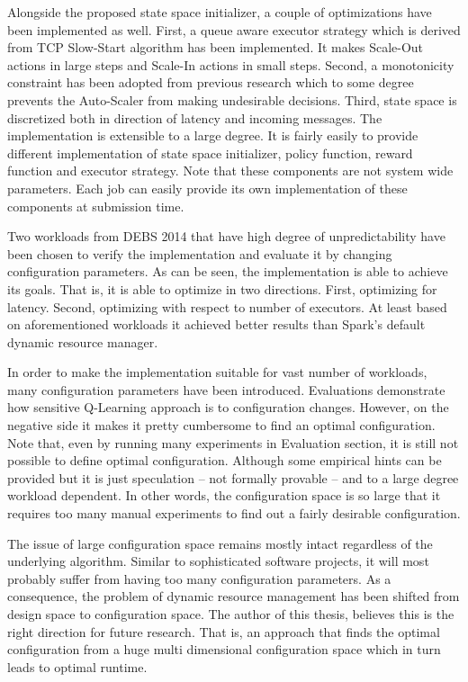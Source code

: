 Alongside the proposed state space initializer, a couple of optimizations have been implemented as well. First, a queue aware executor strategy which is derived from TCP Slow-Start algorithm has been implemented. It makes Scale-Out actions in large steps and Scale-In actions in small steps. Second, a monotonicity constraint has been adopted from previous research which to some degree prevents the Auto-Scaler from making undesirable decisions. Third, state space is discretized both in direction of latency and incoming messages. The implementation is extensible to a large degree. It is fairly easily to provide different implementation of state space initializer, policy function, reward function and executor strategy. Note that these components are not system wide parameters. Each job can easily provide its own implementation of these components at submission time.

Two workloads from DEBS 2014 that have high degree of unpredictability have been chosen to verify the implementation and evaluate it by changing configuration parameters. As can be seen, the implementation is able to achieve its goals. That is, it is able to optimize in two directions. First, optimizing for latency. Second, optimizing with respect to number of executors. At least based on aforementioned workloads it achieved better results than Spark's default dynamic resource manager.

In order to make the implementation suitable for vast number of workloads, many configuration parameters have been introduced. Evaluations demonstrate how sensitive Q-Learning approach is to configuration changes. However, on the negative side it makes it pretty cumbersome to find an optimal configuration. Note that, even by running many experiments in Evaluation section, it is still not possible to define optimal configuration. Although some empirical hints can be provided but it is just speculation -- not formally provable -- and to a large degree workload dependent. In other words, the configuration space is so large that it requires too many manual experiments to find out a fairly desirable configuration.

The issue of large configuration space remains mostly intact regardless of the underlying algorithm. Similar to sophisticated software projects, it will most probably suffer from having too many configuration parameters. As a consequence, the problem of dynamic resource management has been shifted from design space to configuration space. The author of this thesis, believes this is the right direction for future research. That is, an approach that finds the optimal configuration from a huge multi dimensional configuration space which in turn leads to optimal runtime.

